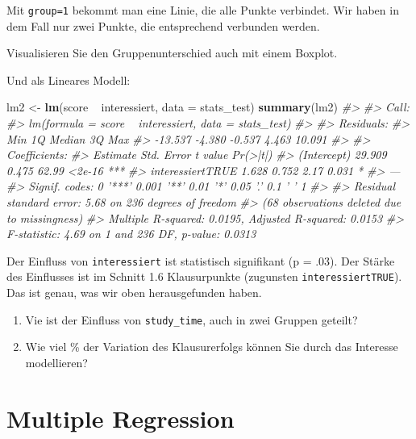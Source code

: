 \documentclass[12pt,ngerman,]{book}
\makeatletter
\newenvironment{Shaded}{\begin{snugshade}}{\end{snugshade}}
\newcommand{\KeywordTok}[1]{\textcolor[rgb]{0.13,0.29,0.53}{\textbf{{#1}}}}
\newcommand{\DataTypeTok}[1]{\textcolor[rgb]{0.13,0.29,0.53}{{#1}}}
\newcommand{\StringTok}[1]{\textcolor[rgb]{0.31,0.60,0.02}{{#1}}}
\newcommand{\CommentTok}[1]{\textcolor[rgb]{0.56,0.35,0.01}{\textit{{#1}}}}
\newcommand{\NormalTok}[1]{{#1}}
\newenvironment{kframe}{%
\medskip{}
\setlength{\fboxsep}{.8em}
 \def\at@end@of@kframe{}%
 \ifinner\ifhmode%
  \def\at@end@of@kframe{\end{minipage}}%
  \begin{minipage}{\columnwidth}%
 \fi\fi%
 \def\FrameCommand##1{\hskip\@totalleftmargin \hskip-\fboxsep
 \colorbox{shadecolor}{##1}\hskip-\fboxsep
     \hskip-\linewidth \hskip-\@totalleftmargin \hskip\columnwidth}%
 \MakeFramed {\advance\hsize-\width
   \@totalleftmargin\z@ \linewidth\hsize
   \@setminipage}}%
 {\par\unskip\endMakeFramed%
 \at@end@of@kframe}
\renewenvironment{Shaded}{\begin{kframe}}{\end{kframe}}
\theoremstyle{definition}
\theoremstyle{definition}
\theoremstyle{remark}
\let\BeginKnitrBlock\begin \let\EndKnitrBlock\end
\makeatother
\begin{document}
Mit \texttt{group=1} bekommt man eine Linie, die alle Punkte verbindet.
Wir haben in dem Fall nur zwei Punkte, die entsprechend verbunden
werden.

Visualisieren Sie den Gruppenunterschied auch mit einem Boxplot.

Und als Lineares Modell:

\begin{Shaded}
\begin{Highlighting}[]
\NormalTok{lm2 <-}\StringTok{ }\KeywordTok{lm}\NormalTok{(score ~}\StringTok{ }\NormalTok{interessiert, }\DataTypeTok{data =} \NormalTok{stats_test)}
\KeywordTok{summary}\NormalTok{(lm2)}
\CommentTok{#> }
\CommentTok{#> Call:}
\CommentTok{#> lm(formula = score ~ interessiert, data = stats_test)}
\CommentTok{#> }
\CommentTok{#> Residuals:}
\CommentTok{#>     Min      1Q  Median      3Q     Max }
\CommentTok{#> -13.537  -4.380  -0.537   4.463  10.091 }
\CommentTok{#> }
\CommentTok{#> Coefficients:}
\CommentTok{#>                  Estimate Std. Error t value Pr(>|t|)    }
\CommentTok{#> (Intercept)        29.909      0.475   62.99   <2e-16 ***}
\CommentTok{#> interessiertTRUE    1.628      0.752    2.17    0.031 *  }
\CommentTok{#> ---}
\CommentTok{#> Signif. codes:  0 '***' 0.001 '**' 0.01 '*' 0.05 '.' 0.1 ' ' 1}
\CommentTok{#> }
\CommentTok{#> Residual standard error: 5.68 on 236 degrees of freedom}
\CommentTok{#>   (68 observations deleted due to missingness)}
\CommentTok{#> Multiple R-squared:  0.0195, Adjusted R-squared:  0.0153 }
\CommentTok{#> F-statistic: 4.69 on 1 and 236 DF,  p-value: 0.0313}
\end{Highlighting}
\end{Shaded}

Der Einfluss von \texttt{interessiert} ist statistisch signifikant (p =
.03). Der Stärke des Einflusses ist im Schnitt 1.6 Klausurpunkte
(zugunsten \texttt{interessiertTRUE}). Das ist genau, was wir oben
herausgefunden haben.

\BeginKnitrBlock{rmdexercises}
\begin{enumerate}
\def\labelenumi{\arabic{enumi}.}
\setcounter{enumi}{2}
\item
  Vie ist der Einfluss von \texttt{study\_time}, auch in zwei Gruppen
  geteilt?
\item
  Wie viel \% der Variation des Klausurerfolgs können Sie durch das
  Interesse modellieren?
\end{enumerate}
\EndKnitrBlock{rmdexercises}

\section{Multiple Regression}\label{multiple-regression}
\end{document}

